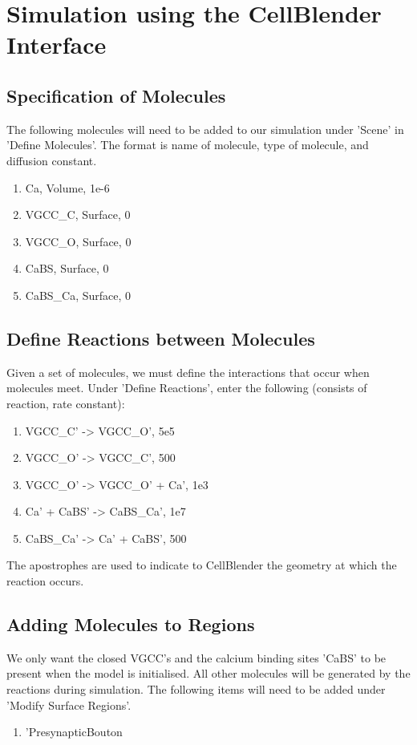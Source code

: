 \documentclass[twoside,a4paper]{refart}
\begin{document}
\section{Simulation using the CellBlender Interface}

\subsection{Specification of Molecules}
The following molecules will need to be added to our simulation under 'Scene' in 'Define Molecules'. The format is name of molecule, type of molecule, and diffusion constant.

\begin{enumerate}
    \item Ca, Volume, 1e-6
    \item VGCC\_C, Surface, 0
    \item VGCC\_O, Surface, 0
    \item CaBS, Surface, 0
    \item CaBS\_Ca, Surface, 0
\end{enumerate}

\subsection{Define Reactions between Molecules}
Given a set of molecules, we must define the interactions that occur when molecules meet. Under 'Define Reactions', enter the following (consists of reaction, rate constant):

\begin{enumerate}
    \item VGCC\_C' -> VGCC\_O', 5e5
    \item VGCC\_O' -> VGCC\_C', 500
    \item VGCC\_O' -> VGCC\_O' + Ca', 1e3
    \item Ca' + CaBS' -> CaBS\_Ca', 1e7
    \item CaBS\_Ca' -> Ca' + CaBS', 500
\end{enumerate}

The apostrophes are used to indicate to CellBlender the geometry at which the reaction occurs.

\subsection{Adding Molecules to Regions}
We only want the closed VGCC's and the calcium binding sites 'CaBS' to be present when the model is initialised. All other molecules will be generated by the reactions during simulation. The following items will need to be added under 'Modify Surface Regions'.

\begin{enumerate}
    \item 'PresynapticBouton

\end{enumerate}
\end{document}
